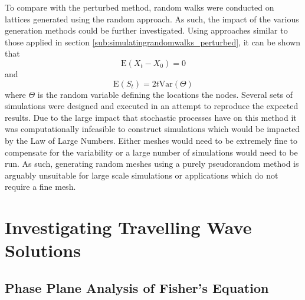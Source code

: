 \documentclass[11pt,a4paper]{article}
\begin{document}
			To compare with the perturbed method, random walks were conducted on lattices generated using the random approach. As such, the impact of the various generation methods could be further investigated. Using approaches similar to those applied in section \ref{sub:simulatingrandomwalks_perturbed}, it can be shown that
			\begin{equation*}
				\mathrm{E} \left(X_t - X_0 \right) = 0
			\end{equation*}
			and 
			\begin{equation*}
				\mathrm{E} \left(S_t \right) = 2 t \mathrm{Var} \left(\Theta \right)
			\end{equation*}
			where $\Theta$ is the random variable defining the locations the nodes. Several sets of simulations were designed and executed in an attempt to reproduce the expected results. Due to the large impact that stochastic processes have on this method it was computationally infeasible to construct simulations which would be impacted by the Law of Large Numbers. Either meshes would need to be extremely fine to compensate for the variability or a large number of simulations would need to be run. As such, generating random meshes using a purely pseudorandom method is arguably unsuitable for large scale simulations or applications which do not require a fine mesh. 
		
	


\section{Investigating Travelling Wave Solutions}
	\label{sec:investigatingfishersequation}
	
	\subsection{Phase Plane Analysis of Fisher's Equation}
		\label{sub:phaseplaneanalysisoffishersequation}
		
\end{document}
